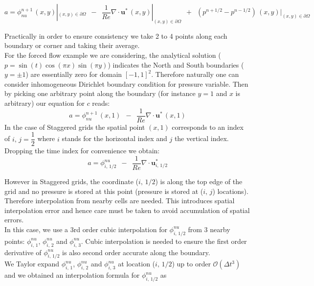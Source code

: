 \begin{equation}
a = \phi^{n+1}_{nu}\,(x,y)|_{(x,y)\in \partial\Omega} \,\,\,-\,\,\, \dfrac{1}{Re} \nabla \cdot \textbf{u}^*\,(x,y)|_{(x,y)\in \partial\Omega}\,\,\, +\,\,\, (p^{n+1/2} - p^{n-1/2})\,(x,y)|_{(x,y)\in \partial\Omega}
\end{equation}

Practically in order to ensure consistency we take 2 to 4 points along each boundary or corner and taking their average. \\

For the forced flow example we are considering, the analytical solution ($p = \sin(t)\cos(\pi x)\sin(\pi y)$) indicates the North and South boundaries ($y=\pm 1$) are essentially zero for domain $[-1,1]^2$. Therefore naturally one can consider inhomogeneous Dirichlet boundary condition for pressure variable. Then by picking one arbitrary point along the boundary (for instance $y=1$ and $x$ is arbitrary) our equation for $c$ reads:
\begin{equation*}
a = \phi^{n+1}_{nu}\,(x,1) \,\,\,-\,\,\, \dfrac{1}{Re} \nabla \cdot \textbf{u}^*\,(x,1)
\end{equation*}
In the case of Staggered grids the spatial point $(x,1)$ corresponds to an index of $i, \, j = \dfrac{1}{2}$ where $i$ stands for the horizontal index and $j$ the vertical index. Dropping the time index for convenience we obtain:
\begin{equation*}
a = \phi^{nu}_{i,\,1/2} \,\,\,-\,\,\, \dfrac{1}{Re} \nabla \cdot \textbf{u}^*_{i,\,1/2}
\end{equation*}

However in Staggered grids, the coordinate ($i,\,1/2$) is along the top edge of the grid and no pressure is stored at this point (pressure is stored at ($i,\,j$) locations). Therefore interpolation from nearby cells are needed. This introduces spatial interpolation error and hence care must be taken to avoid accumulation of spatial errors.\\

In this case, we use a 3rd order cubic interpolation for $\phi^{nu}_{i,\,1/2}$ from 3 nearby points: $\phi^{nu}_{i,\,1}$, $\phi^{nu}_{i,\,2}$ and $\phi^{nu}_{i,\,3}$. Cubic interpolation is needed to ensure the first order derivative of $\phi^{nu}_{i,\,1/2}$ is also second order accurate along the boundary.\\
We Taylor expand $\phi^{nu}_{i,\,1}$, $\phi^{nu}_{i,\,2}$ and $\phi^{nu}_{i,\,3}$ at location ($i,\,1/2$) up to order $\mathcal{O}(\Delta t^3)$ and we obtained an interpolation formula for $\phi^{nu}_{i,\,1/2}$ as

